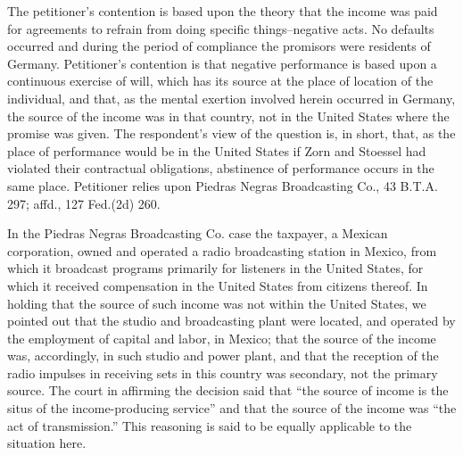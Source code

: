\begin{select}
The petitioner's contention is based upon the theory that the income was paid for agreements to refrain from doing specific things--negative acts. No defaults occurred and during the period of compliance the promisors were residents of Germany. Petitioner's contention is that negative performance is based upon a continuous exercise of will, which has its source at the place of location of the individual, and that, as the mental exertion involved herein occurred in Germany, the source of the income was in that country, not in the United States where the promise was given. The respondent's view of the question is, in short, that, as the place of performance would be in the United States if Zorn and Stoessel had violated their contractual obligations, abstinence of performance occurs in the same place. Petitioner relies upon Piedras Negras Broadcasting Co., 43 B.T.A. 297; affd., 127 Fed.(2d) 260.

In the Piedras Negras Broadcasting Co. case the taxpayer, a Mexican corporation, owned and operated a radio broadcasting station in Mexico, from which it broadcast programs primarily for listeners in the United States, for which it received compensation in the United States from citizens thereof. In holding that the source of such income was not within the United States, we pointed out that the studio and broadcasting plant were located, and operated by the employment of capital and labor, in Mexico; that the source of the income was, accordingly, in such studio and power plant, and that the reception of the radio impulses in receiving sets in this country was secondary, not the primary source. The court in affirming the decision said that ``the source of income is the situs of the income-producing service'' and that the source of the income was ``the act of transmission.'' This reasoning is said to be equally applicable to the situation here.


\end{select}
